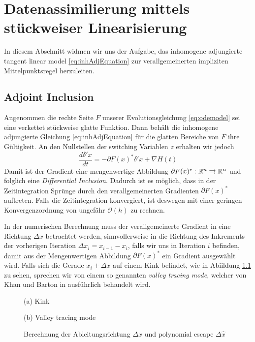 % 
\chapter{Datenassimilierung mittels stückweiser Linearisierung}
In diesem Abschnitt widmen wir uns der Aufgabe, das inhomogene adjungierte tangent linear model \eqref{eq:inhAdjEquation} zur verallgemeinerten impliziten Mittelpunktsregel herzuleiten.

\section{Adjoint Inclusion}
\label{sec:adjointInclusion}
Angenommen die rechte Seite $F$ unserer Evolutionsgleichung \eqref{eq:odemodel} sei eine verkettet stückweise glatte Funktion. Dann behält die inhomogene adjungierte Gleichung \eqref{eq:inhAdjEquation} für die glatten Bereiche von $F$ ihre Gültigkeit. An den Nullstellen der switching Variablen $z$ erhalten wir jedoch
\begin{equation}
 \label{eq:adjInclusion}
 \frac{d \delta' x}{dt} =- \partial F(x)^*\delta'x + \nabla H(t)
\end{equation}
Damit ist der Gradient eine mengenwertige Abbildung $\partial F(x)^*:\mathbb{R}^n\rightrightarrows \mathbb{R}^n$ und folglich eine \textit{Differential Inclusion}.
Dadurch ist es möglich, dass in der Zeitintegration Sprünge durch den verallgemeinerten Gradienten $\partial F(x)^*$ auftreten. Falls die Zeitintegration konvergiert, ist deswegen mit einer geringen Konvergenzordnung von ungefähr $\mathcal O(h)$ zu rechnen.

In der numerischen Berechnung muss der verallgemeinerte Gradient in eine Richtung $\Delta x$ betrachtet werden, sinnvollerweise in die Richtung des Inkrements der vorherigen Iteration $\Delta x_i = x_{i-1} - x_i$, falls wir uns in Iteration $i$ befinden, damit aus der Mengenwertigen Abbildung $ \partial F(x)^*$ ein Gradient ausgewählt wird. 
Falls sich die Gerade $x_i + \Delta x$ auf einem Kink befindet, wie in Abiildung \ref{fig:adjValleyTracing} zu sehen, sprechen wir von einem so genannten \textit{valley tracing mode}, welcher von Khan und Barton in \cite{khan2014} ausführlich behandelt wird. 
\begin{figure}
\centering
\begin{minipage}[b]{0.49\linewidth}
\centering

\caption*{(a) Kink}
\end{minipage}
\begin{minipage}[b]{0.49\linewidth}
\centering

\caption*{(b) Valley tracing mode}
\end{minipage}
\caption{Berechnung der Ableitungsrichtung $\Delta x$ und polynomial escape $\Delta \hat x$ }
\label{fig:adjValleyTracing}
\end{figure}

